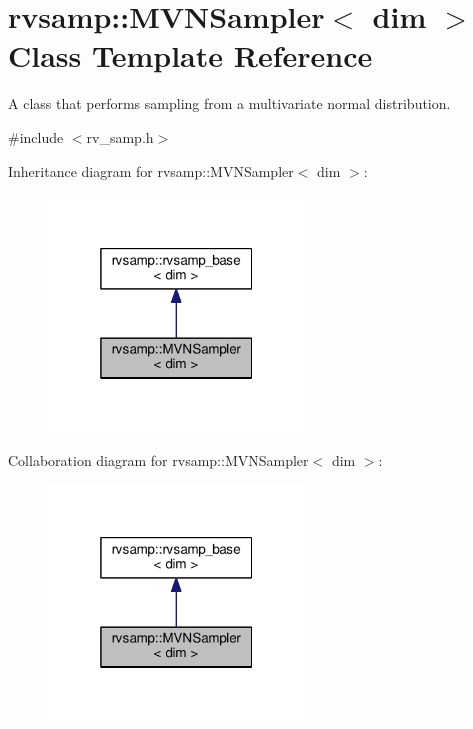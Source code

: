 \hypertarget{classrvsamp_1_1MVNSampler}{}\section{rvsamp\+:\+:M\+V\+N\+Sampler$<$ dim $>$ Class Template Reference}
\label{classrvsamp_1_1MVNSampler}


A class that performs sampling from a multivariate normal distribution.  




{\ttfamily \#include $<$rv\+\_\+samp.\+h$>$}



Inheritance diagram for rvsamp\+:\+:M\+V\+N\+Sampler$<$ dim $>$\+:\nopagebreak
\begin{figure}[H]
\begin{center}
\leavevmode
\includegraphics[width=193pt]{classrvsamp_1_1MVNSampler__inherit__graph}
\end{center}
\end{figure}


Collaboration diagram for rvsamp\+:\+:M\+V\+N\+Sampler$<$ dim $>$\+:\nopagebreak
\begin{figure}[H]
\begin{center}
\leavevmode
\includegraphics[width=193pt]{classrvsamp_1_1MVNSampler__coll__graph}
\end{center}
\end{figure}
